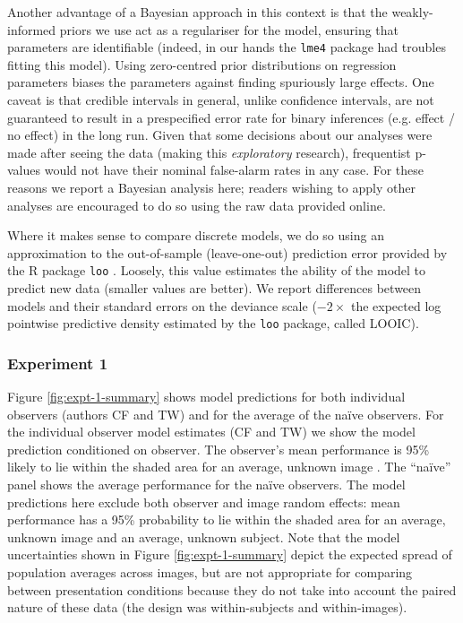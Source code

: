 \documentclass[article, 11pt,a4paper,natbib]{apa6}\usepackage[]{graphicx}\usepackage[]{color}
\begin{document}
Another advantage of a Bayesian approach in this context is that the weakly-informed priors we use act as a regulariser for the model, ensuring that parameters are identifiable (indeed, in our hands the \texttt{lme4} package had troubles fitting this model). 
Using zero-centred prior distributions on regression parameters biases the parameters against finding spuriously large effects.
One caveat is that credible intervals in general, unlike confidence intervals, are not guaranteed to result in a prespecified error rate for binary inferences (e.g. effect / no effect) in the long run.
Given that some decisions about our analyses were made after seeing the data (making this \textit{exploratory} research), frequentist p-values would not have their nominal false-alarm rates in any case.
For these reasons we report a Bayesian analysis here; readers wishing to apply other analyses are encouraged to do so using the raw data provided online.

Where it makes sense to compare discrete models, we do so using an approximation to the out-of-sample (leave-one-out) prediction error provided by the R package \texttt{loo} \citep[v 1.1.0;][]{vehtari_practical_2016}.
Loosely, this value estimates the ability of the model to predict new data (smaller values are better).
We report differences between models and their standard errors on the deviance scale ($-2 \times$ the expected log pointwise predictive density estimated by the \texttt{loo} package, called LOOIC).

\subsubsection{Experiment 1}



Figure \ref{fig:expt-1-summary} shows model predictions for both individual observers (authors CF and TW) and for the average of the na\"{i}ve observers.
For the individual observer model estimates (CF and TW) we show the model prediction conditioned on observer. 
The observer's mean performance is 95\% likely to lie within the shaded area for an average, unknown image \citep{baayen_mixed-effects_2008}.
The ``na\"{i}ve'' panel shows the average performance for the na\"{i}ve observers.
The model predictions here exclude both observer and image random effects: mean performance has a 95\% probability to lie within the shaded area for an average, unknown image and an average, unknown subject.
Note that the model uncertainties shown in Figure \ref{fig:expt-1-summary} depict the expected spread of population averages across images, but are not appropriate for comparing between presentation conditions because they do not take into account the paired nature of these data (the design was within-subjects and within-images).
\end{document}
